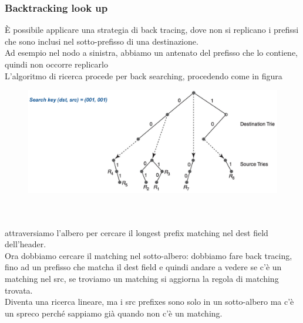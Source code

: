 \documentclass[12pt, oneside]{extbook} %
\begin{document}
\subsubsection{Backtracking look up}
È possibile applicare una strategia di back tracing, dove non si replicano i prefissi che sono inclusi nel sotto-prefisso di una destinazione.
\\Ad esempio nel nodo a sinistra, abbiamo un antenato del prefisso che lo contiene, quindi non occorre replicarlo\\
L'algoritmo di ricerca procede per back searching, procedendo come in figura\\
\begin{figure}[h!]
    \centering
    \includegraphics[scale=0.5]{../../immagini/backtracking}
\end{figure}\\\\
attraversiamo l'albero per cercare il longest prefix matching nel dest field dell'header.
\\Ora dobbiamo cercare il matching nel sotto-albero: dobbiamo fare back tracing, fino ad un prefisso che matcha il dest field e quindi andare a vedere se c'è un matching nel src, se troviamo un matching si aggiorna la regola di matching trovata.
\\Diventa una ricerca lineare, ma i src prefixes sono solo in un sotto-albero ma c'è un spreco perché sappiamo già quando non c'è un matching.
\end{document}
